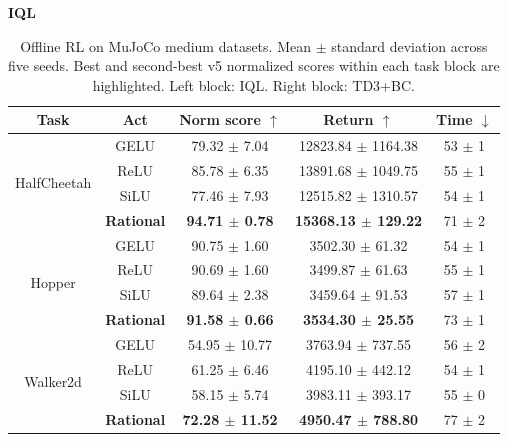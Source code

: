 \documentclass{article}
\theoremstyle{plain}
\theoremstyle{definition}
\theoremstyle{remark}
\begin{document}
\begin{table}[t]
\centering
\caption{ {Offline RL on MuJoCo medium datasets. Mean $\pm$ standard deviation across five seeds. Best and second-best v5 normalized scores within each task block are highlighted. Left block: IQL. Right block: TD3+BC.}}
\label{tab:offline_rl_main}
\scriptsize
\renewcommand{\arraystretch}{1.06}
\setlength{\tabcolsep}{2.15pt}
\begingroup
\begin{minipage}[t]{0.49\textwidth}
\centering
\textbf{IQL}\par\vspace{0.25em}
\begin{tabular}{@{}ccccc@{}}
\toprule
Task & Act & Norm score $\uparrow$ & Return $\uparrow$ & Time $\downarrow$ \\
\midrule
\multirow{4}{*}{HalfCheetah} & GELU & 79.32 $\pm$ 7.04 & 12823.84 $\pm$ 1164.38 & 53 $\pm$ 1 \\
& ReLU & \cellcolor{orange!22}85.78 $\pm$ 6.35 & \cellcolor{orange!22} 13891.68 $\pm$ 1049.75 & 55 $\pm$ 1 \\
& SiLU & 77.46 $\pm$ 7.93 & 12515.82 $\pm$ 1310.57 & 54 $\pm$ 1 \\
& \textbf{Rational} & \cellcolor{green!22}\textbf{94.71 $\pm$ 0.78} & \cellcolor{green!22}\textbf{ 15368.13 $\pm$ 129.22} & 71 $\pm$ 2 \\
\midrule
\multirow{4}{*}{Hopper} & GELU & \cellcolor{orange!22}90.75 $\pm$ 1.60 & \cellcolor{orange!22} 3502.30 $\pm$ 61.32 & 54 $\pm$ 1 \\
& ReLU & 90.69 $\pm$ 1.60 & 3499.87 $\pm$ 61.63 & 55 $\pm$ 1 \\
& SiLU & 89.64 $\pm$ 2.38 & 3459.64 $\pm$ 91.53 & 57 $\pm$ 1 \\
& \textbf{Rational} & \cellcolor{green!22}\textbf{91.58 $\pm$ 0.66} & \cellcolor{green!22} \textbf{3534.30 $\pm$ 25.55} & 73 $\pm$ 1 \\
\midrule
\multirow{4}{*}{Walker2d} & GELU & 54.95 $\pm$ 10.77 & 3763.94 $\pm$ 737.55 & 56 $\pm$ 2 \\
& ReLU & \cellcolor{orange!22}61.25 $\pm$ 6.46 & \cellcolor{orange!22} 4195.10 $\pm$ 442.12 & 54 $\pm$ 1 \\
& SiLU & 58.15 $\pm$ 5.74 & 3983.11 $\pm$ 393.17 & 55 $\pm$ 0 \\
& \textbf{Rational} & \cellcolor{green!22}\textbf{72.28 $\pm$ 11.52} & \cellcolor{green!22} \textbf{4950.47 $\pm$ 788.80} & 77 $\pm$ 2 \\

\end{tabular}
\end{minipage}
\end{table}
\end{document}
